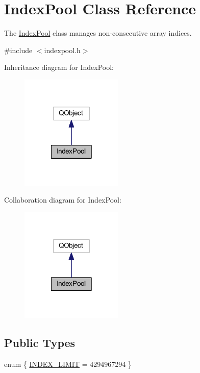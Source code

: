 \hypertarget{class_index_pool}{\section{Index\-Pool Class Reference}
\label{class_index_pool}
}


The \hyperlink{class_index_pool}{Index\-Pool} class manages non-\/consecutive array indices.  




{\ttfamily \#include $<$indexpool.\-h$>$}



Inheritance diagram for Index\-Pool\-:
\nopagebreak
\begin{figure}[H]
\begin{center}
\leavevmode
\includegraphics[width=138pt]{class_index_pool__inherit__graph}
\end{center}
\end{figure}


Collaboration diagram for Index\-Pool\-:
\nopagebreak
\begin{figure}[H]
\begin{center}
\leavevmode
\includegraphics[width=138pt]{class_index_pool__coll__graph}
\end{center}
\end{figure}
\subsection*{Public Types}
\begin{DoxyCompactItemize}
\item 
enum \{ \hyperlink{class_index_pool_abacc88fb0ea6d1dcad5be70710ed0e3da3a3d6446453050cd4c95439b37b6824a}{I\-N\-D\-E\-X\-\_\-\-L\-I\-M\-I\-T} = 4294967294
 \}
\end{DoxyCompactItemize}
